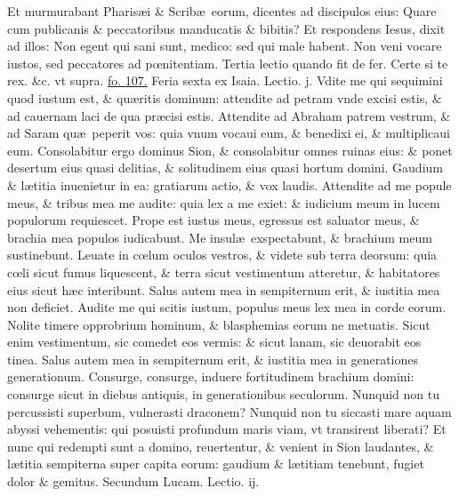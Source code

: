 \documentclass[a5paper,10pt]{book}
\def\rightmarginnote{%
	\lrmarginnote{\hskip\columnwidth \hskip -1em}}
\def\ae{æ}
\def\oe{œ}
\begin{document}
\begin{multicols*}{2}
Et murmurabant Pharis\ae i \& Scrib\ae \ eorum, dicentes ad discipulos eius: Quare cum publicanis \& peccatoribus manducatis \& bibitis?
Et respondens Iesus, dixit ad illos: Non egent qui sani sunt, medico: sed qui male habent.
Non veni vocare iustos, sed peccatores ad p\oe nitentiam.
\newline \color{red} Tertia lectio quando fit de fer. \color{black} Certe si te rex. \color{red} \&c. vt supra. \color{black} \hyperlink{page.107}{fo. 107.}
\newline {} \color{red} \hypertarget{FRI-SECUNDA-ADV}{Feria sexta} ex Isaia. \hfill Lectio. j. \color{black}
\vspace{-.25em}
Vdite me\rightmarginnote{c. 51.} qui sequimini quod iustum est, \& qu\ae ritis dominum: attendite ad petram vnde excisi estis, \& ad cauernam laci de qua pr\ae cisi estis.
Attendite ad Abraham patrem vestrum, \& ad Saram qu\ae \ peperit vos: quia vnum vocaui eum, \& benedixi ei, \& multiplicaui eum.
Consolabitur ergo dominus Sion, \& consolabitur omnes ruinas eius: \& ponet desertum eius quasi delitias, \& solitudinem eius quasi hortum domini.
Gaudium \& l\ae titia inuenietur in ea: gratiarum actio, \& vox laudis.
Attendite ad me popule meus, \& tribus mea me audite: quia lex a me exiet: \& iudicium meum in lucem populorum requiescet.
Prope est iustus meus, egressus est saluator meus, \& brachia mea populos iudicabunt.
Me insul\ae \ exspectabunt, \& brachium meum sustinebunt.
Leuate in c\oe lum oculos vestros, \& videte sub terra deorsum: quia c\oe li sicut fumus liquescent, \& terra sicut vestimentum atteretur, \& habitatores eius sicut h\ae c interibunt.
Salus autem mea in sempiternum erit, \& iustitia mea non deficiet.
Audite me qui scitis iustum, populus meus lex mea in corde eorum.
Nolite timere opprobrium hominum, \& blasphemias eorum ne metuatis.
Sicut enim vestimentum, sic comedet eos vermis: \& sicut lanam, sic deuorabit eos tinea.
Salus autem mea in sempiternum erit, \& iustitia mea in generationes generationum.
Consurge, consurge, induere fortitudinem brachium domini: consurge sicut in diebus antiquis, in generationibus seculorum.
Nunquid non tu percussisti superbum, vulnerasti draconem?
Nunquid non tu siccasti mare aquam abyssi vehementis: qui posuisti profundum maris viam, vt transirent liberati?
Et nunc qui redempti sunt a domino, reuertentur, \& venient in Sion laudantes, \& l\ae titia sempiterna super capita eorum: gaudium \& l\ae titiam tenebunt, fugiet dolor \& gemitus.
\newline \color{red} Secundum Lucam. \hfill Lectio. ij. \color{black}

\end{multicols*}
\end{document}
